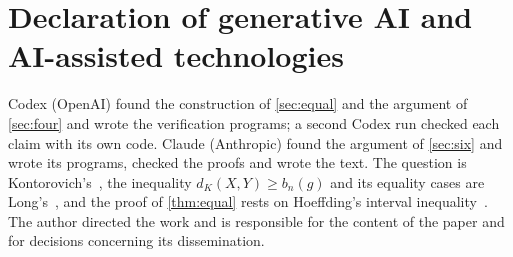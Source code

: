\documentclass[11pt,a4paper]{article}
\numberwithin{equation}{section}
\theoremstyle{remark}
\begin{document}
\section*{Declaration of generative AI and AI-assisted technologies}
Codex (OpenAI) found the construction of \cref{sec:equal} and the argument of \cref{sec:four} and wrote the verification programs; a second Codex run checked each claim with its own code. Claude (Anthropic) found the argument of \cref{sec:six} and wrote its programs, checked the proofs and wrote the text. The question is Kontorovich's~\cite{Kontorovich}, the inequality $d_K(X,Y)\ge b_n(g)$ and its equality cases are Long's~\cite{Long}, and the proof of \cref{thm:equal} rests on Hoeffding's interval inequality~\cite{Hoeffding}. The author directed the work and is responsible for the content of the paper and for decisions concerning its dissemination.

\appendix
\end{document}
